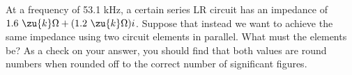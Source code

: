 At a frequency of 53.1 kHz, a certain series LR circuit has an impedance of $1.6\ \zu{k}\Omega+(1.2\ \zu{k}\Omega)i$.
Suppose that instead we want to achieve the same impedance using two circuit elements in parallel.
What must the elements be? As a check on your answer, you should find that both values are round numbers
when rounded off to the correct number of significant figures.
